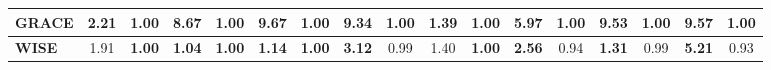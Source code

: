 \begin{table}[t]
{\begin{tabular}{l|cc|cc|cc|cc!{\vrule width 0.09em}cc|cc|cc|cc}
     GRACE &2.21 &\textbf{1.00}  &8.67 &\textbf{1.00}  &9.67 &\textbf{1.00}  &9.34 &\textbf{1.00} &\textbf{1.39} &\textbf{1.00}  &5.97 &\textbf{1.00}  &9.53 &\textbf{1.00}  &9.57 &\textbf{1.00}\\
     \midrule
     \textbf{WISE} &1.91 &\textbf{1.00}  &\textbf{1.04} &\textbf{1.00}  &\textbf{1.14} &\textbf{1.00}  &\textbf{3.12} &0.99 &1.40 &\textbf{1.00}  &\textbf{2.56} &0.94  &\textbf{1.31} &0.99  &\textbf{5.21} &0.93\\
    \bottomrule 
    \end{tabular}
    }
    \label{tab:halluc_main_editing}
    \vspace{-0.3cm}
\end{table}


